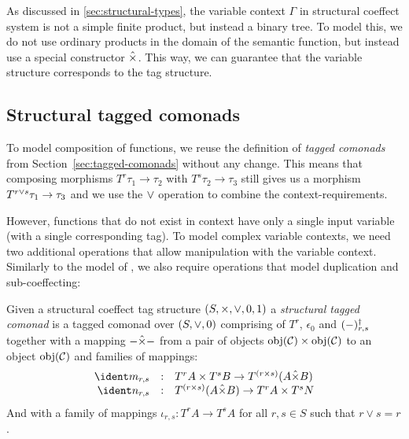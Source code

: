 As discussed in \ref{sec:structural-types}, the variable context $\Gamma$ in structural coeffect
system is not a simple finite product, but instead a binary tree. To model this, we do not use
ordinary products in the domain of the semantic function, but instead use a special 
constructor $\hat{\times}$. This way, we can guarantee that the variable structure corresponds to 
the tag structure. 

\subsection{Structural tagged comonads}
\label{sec:structural-tagged-comonads}

To model composition of functions, we reuse the definition of \emph{tagged comonads} from 
Section~\ref{sec:tagged-comonads} without any change. This means that composing morphisms
$T^r \tau_1 \rightarrow \tau_2$ with $T^s \tau_2 \rightarrow \tau_3$ still gives us a morphism
$T^{r \vee s} \tau_1 \rightarrow \tau_3$ and we use the $\vee$ operation to combine the 
context-requirements.

However, functions that do not exist in context have only a single input variable (with a 
single corresponding tag). To model complex variable contexts, we need two additional
operations that allow manipulation with the variable context. Similarly to the model of \clflt,
we also require operations that model duplication and sub-coeffecting:

\begin{definition}
Given a structural coeffect tag structure $(S, \times, \vee, 0, 1)$ a \emph{structural tagged comonad} is a 
tagged comonad over $(S, \vee, 0)$ comprising of $T^r$, $\epsilon_0$ and
$(-)^\dagger_{r, s}$ together with a mapping $- \hat{\times} -$ from a pair of objects 
$\textnormal{obj}(\mathcal{C}) \times \textnormal{obj}(\mathcal{C})$ to an object $\textnormal{obj}(\mathcal{C})$ and families of mappings:
%
\begin{equation*}
\begin{array}{rcl}
\cmerge_{r, s} &:& T^r A \times T^s B \rightarrow T^{(r \csprd s)}(A \ctimes B)\\
\csplit_{r, s} &:& T^{(r \csprd s)}(A \ctimes B) \rightarrow T^r A \times T^s N\\
\end{array}
\end{equation*}
%
%
And with a family of mappings $\iota_{r, s} : T^r A \rightarrow T^s A$ for all $r, s \in S$ such that $r \vee s = r$.
%
%
\end{definition}

